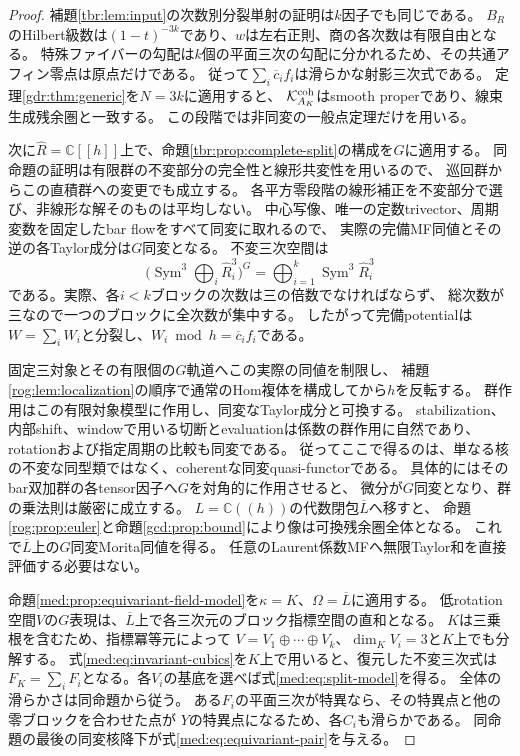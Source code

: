 \begin{proof}
補題\ref{tbr:lem:input}の次数別分裂単射の証明は$k$因子でも同じである。
$B_R$のHilbert級数は$(1-t)^{-3k}$であり、$w$は左右正則、商の各次数は有限自由となる。
特殊ファイバーの勾配は$k$個の平面三次の勾配に分かれるため、その共通アフィン零点は原点だけである。
従って$\sum_i\overline c_i f_i$は滑らかな射影三次式である。
定理\ref{gdr:thm:generic}を$N=3k$に適用すると、
$\mathcal K^{\rm coh}_{A_K}$はsmooth properであり、線束生成残余圏と一致する。
この段階では非同変の一般点定理だけを用いる。

次に$\widehat R=\mathbb C[[h]]$上で、命題\ref{tbr:prop:complete-split}の構成を$G$に適用する。
同命題の証明は有限群の不変部分の完全性と線形共変性を用いるので、
巡回群からこの直積群への変更でも成立する。
各平方零段階の線形補正を不変部分で選び、非線形な解そのものは平均しない。
中心写像、唯一の定数trivector、周期変数を固定したbar flowをすべて同変に取れるので、
実際の完備MF同値とその逆の各Taylor成分は$G$同変となる。
不変三次空間は
\begin{equation}\label{med:eq:invariant-cubics}
 \bigl(\operatorname{Sym}^3\textstyle\bigoplus_i\widehat R^3_i\bigr)^G
 =\bigoplus_{i=1}^k\operatorname{Sym}^3\widehat R^3_i
\end{equation}
である。実際、各$i<k$ブロックの次数は三の倍数でなければならず、
総次数が三なので一つのブロックに全次数が集中する。
したがって完備potentialは$W=\sum_iW_i$と分裂し、$W_i\bmod h=\overline c_if_i$である。

固定三対象とその有限個の$G$軌道へこの実際の同値を制限し、
補題\ref{rog:lem:localization}の順序で通常のHom複体を構成してから$h$を反転する。
群作用はこの有限対象模型に作用し、同変なTaylor成分と可換する。
stabilization、内部shift、windowで用いる切断とevaluationは係数の群作用に自然であり、
rotationおよび指定周期の比較も同変である。
従ってここで得るのは、単なる核の不変な同型類ではなく、coherentな同変quasi-functorである。
具体的にはそのbar双加群の各tensor因子へ$G$を対角的に作用させると、
微分が$G$同変となり、群の乗法則は厳密に成立する。
$L=\mathbb C((h))$の代数閉包$\overline L$へ移すと、
命題\ref{rog:prop:euler}と命題\ref{gcd:prop:bound}により像は可換残余圏全体となる。
これで$\overline L$上の$G$同変Morita同値を得る。
任意のLaurent係数MFへ無限Taylor和を直接評価する必要はない。

命題\ref{med:prop:equivariant-field-model}を$\kappa=K$、$\Omega=\overline L$に適用する。
低rotation空間$V$の$G$表現は、$\overline L$上で各三次元のブロック指標空間の直和となる。
$K$は三乗根を含むため、指標冪等元によって
$V=V_1\oplus\cdots\oplus V_k$、$\dim_KV_i=3$と$K$上でも分解する。
式\eqref{med:eq:invariant-cubics}を$K$上で用いると、復元した不変三次式は
$F_K=\sum_iF_i$となる。各$V_i$の基底を選べば式\eqref{med:eq:split-model}を得る。
全体の滑らかさは同命題から従う。
ある$F_i$の平面三次が特異なら、その特異点と他の零ブロックを合わせた点が
$Y$の特異点になるため、各$C_i$も滑らかである。
同命題の最後の同変核降下が式\eqref{med:eq:equivariant-pair}を与える。
\end{proof}

